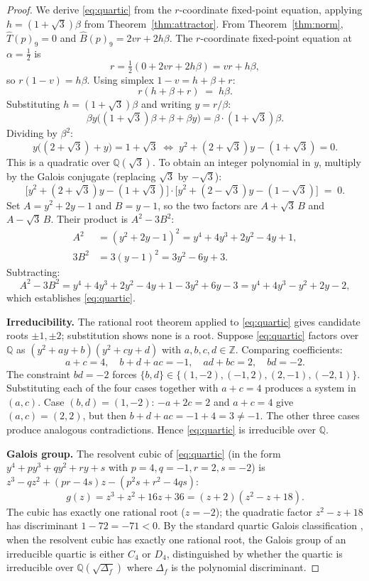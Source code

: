\documentclass[11pt,reqno]{amsart}
\theoremstyle{plain}
\theoremstyle{definition}
\theoremstyle{remark}
\newcommand{\Z}{\mathbb{Z}}
\newcommand{\Q}{\mathbb{Q}}
\newcommand{\Tfuse}{\widehat{T}}
\newcommand{\Bfuse}{\widehat{B}}
\begin{document}
\begin{proof}
We derive \eqref{eq:quartic} from the $r$-coordinate fixed-point
equation, applying $h=(1+\sqrt{3})\beta$ from
Theorem~\ref{thm:attractor}. From Theorem~\ref{thm:norm},
$\Tfuse(p)_{9}=0$ and $\Bfuse(p)_{9}=2vr+2h\beta$. The
$r$-coordinate fixed-point equation at $\alpha=\tfrac12$ is
\[
r=\tfrac12(0+2vr+2h\beta)=vr+h\beta,
\]
so $r(1-v)=h\beta$. Using simplex $1-v=h+\beta+r$:
\begin{equation}\label{eq:R-coord}
r(h+\beta+r)\;=\;h\beta.
\end{equation}
Substituting $h=(1+\sqrt{3})\beta$ and writing $y=r/\beta$:
\[
\beta y\bigl((1+\sqrt{3})\beta+\beta+\beta y\bigr)=\beta\cdot(1+\sqrt{3})\beta.
\]
Dividing by $\beta^{2}$:
\[
y\bigl((2+\sqrt{3})+y\bigr)=1+\sqrt{3}\;\Longleftrightarrow\;
y^{2}+(2+\sqrt{3})y-(1+\sqrt{3})=0.
\]
This is a quadratic over $\Q(\sqrt{3})$. To obtain an integer
polynomial in $y$, multiply by the Galois conjugate (replacing
$\sqrt{3}$ by $-\sqrt{3}$):
\[
\bigl[y^{2}+(2+\sqrt{3})y-(1+\sqrt{3})\bigr]\cdot
\bigl[y^{2}+(2-\sqrt{3})y-(1-\sqrt{3})\bigr]\;=\;0.
\]
Set $A=y^{2}+2y-1$ and $B=y-1$, so the two factors are
$A+\sqrt{3}\,B$ and $A-\sqrt{3}\,B$. Their product is
$A^{2}-3B^{2}$:
\begin{align*}
A^{2}&=(y^{2}+2y-1)^{2}=y^{4}+4y^{3}+2y^{2}-4y+1,\\
3B^{2}&=3(y-1)^{2}=3y^{2}-6y+3.
\end{align*}
Subtracting:
\[
A^{2}-3B^{2}=y^{4}+4y^{3}+2y^{2}-4y+1-3y^{2}+6y-3=y^{4}+4y^{3}-y^{2}+2y-2,
\]
which establishes \eqref{eq:quartic}.

\textbf{Irreducibility.} The rational root theorem applied to
\eqref{eq:quartic} gives candidate roots $\pm 1,\pm 2$;
substitution shows none is a root. Suppose
\eqref{eq:quartic} factors over $\Q$ as
$(y^{2}+ay+b)(y^{2}+cy+d)$ with $a,b,c,d\in\Z$. Comparing
coefficients:
\[
a+c=4,\quad b+d+ac=-1,\quad ad+bc=2,\quad bd=-2.
\]
The constraint $bd=-2$ forces
$\{b,d\}\in\{(1,-2),(-1,2),(2,-1),(-2,1)\}$. Substituting each of
the four cases together with $a+c=4$ produces a system in
$(a,c)$. Case $(b,d)=(1,-2)$: $-a+2c=2$ and $a+c=4$ give
$(a,c)=(2,2)$, but then $b+d+ac=-1+4=3\neq -1$. The other three
cases produce analogous contradictions. Hence \eqref{eq:quartic}
is irreducible over $\Q$.

\textbf{Galois group.} The resolvent cubic of \eqref{eq:quartic}
(in the form $y^{4}+py^{3}+qy^{2}+ry+s$ with $p=4,q=-1,r=2,s=-2$)
is $z^{3}-qz^{2}+(pr-4s)z-(p^{2}s+r^{2}-4qs)$:
\[
g(z)=z^{3}+z^{2}+16z+36=(z+2)(z^{2}-z+18).
\]
The cubic has exactly one rational root ($z=-2$); the quadratic
factor $z^{2}-z+18$ has discriminant $1-72=-71<0$. By the
standard quartic Galois classification
\cite[\S~14.6]{DummitFoote2004}, when the resolvent cubic has
exactly one rational root, the Galois group of an irreducible
quartic is either $C_{4}$ or $D_{4}$, distinguished by whether
the quartic is irreducible over $\Q(\sqrt{\Delta_{f}})$ where
$\Delta_{f}$ is the polynomial discriminant.


\end{proof}
\end{document}
